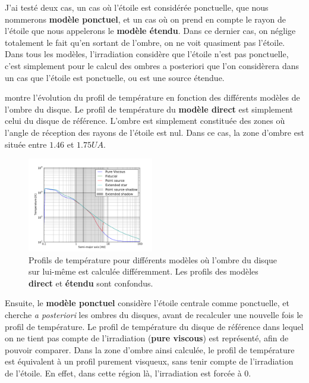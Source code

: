 J'ai testé deux cas, un cas où l'étoile est considérée ponctuelle, que nous nommerons \textbf{modèle ponctuel}, et un cas où on prend en compte le rayon de l'étoile que nous appelerons le \textbf{modèle étendu}. Dans ce dernier cas, on néglige totalement le fait qu'en sortant de l'ombre, on ne voit quasiment pas l'étoile. Dans tous les modèles, l'irradiation considère que l'étoile n'est pas ponctuelle, c'est simplement pour le calcul des ombres a posteriori que l'on considèrera dans un cas que l'étoile est ponctuelle, ou est une source étendue. 

 montre l'évolution du profil de température en fonction des différents modèles de l'ombre du disque. Le profil de température du \textbf{modèle direct} est simplement celui du disque de référence. L'ombre est simplement constituée des zones où l'angle de réception des rayons de l'étoile est nul. Dans ce cas, la zone d'ombre est située entre $1.46$ et $1.75\unit{UA}$.

\begin{figure}[htb]
\centering
\includegraphics[width=0.49\textwidth]{figure/shadow/fiducial_temperature_profile.pdf}

\caption{Profils de température pour différents modèles où l'ombre du disque sur lui-même est calculée différemment.  Les profils des modèles \textbf{direct} et \textbf{étendu} sont confondus. }\label{fig:shadow_temp_profile}
\end{figure}

Ensuite, le \textbf{modèle ponctuel} considère l'étoile centrale comme ponctuelle, et cherche \textit{a posteriori} les ombres du disques, avant de recalculer une nouvelle fois le profil de température. Le profil de température du disque de référence dans lequel on ne tient pas compte de l'irradiation (\textbf{pure viscous}) est représenté, afin de pouvoir comparer. Dans la zone d'ombre ainsi calculée, le profil de température est équivalent à un profil purement visqueux, sans tenir compte de l'irradiation de l'étoile. En effet, dans cette région là, l'irradiation est forcée à 0. 

